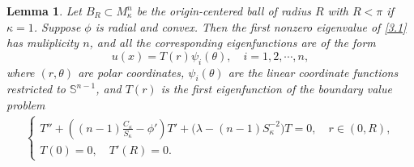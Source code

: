 \documentclass[11pt,leqno]{amsart}
\newtheorem{lemma}{Lemma}[section]
\def\k{\kappa}
\def\k{\kappa}
\numberwithin{equation}{section}
\begin{document}
\begin{lemma}\label{lm3.1}
Let $B_R\subset M_\k^n$ be the origin-centered ball of radius $R$ with $R<\pi$ if $\k=1$. Suppose $\phi$ is  radial and convex. Then the first nonzero eigenvalue  of \eqref{3.1} has muliplicity $n$, and all the corresponding eigenfunctions are of the form
$$
u(x)=T(r)\psi_i(\theta), \quad i=1,2, \cdots, n,
$$
where $(r, \theta)$ are polar coordinates, $\psi_i(\theta)$ are the linear coordinate functions restricted to $\mathbb{S}^{n-1}$, and 
$T(r)$ is the first eigenfunction of the boundary value problem
\begin{align}\label{3.2}
    \begin{cases}
T'' + \left((n-1)\frac{C_\kappa}{S_\kappa} - \phi'\right)T' + \big(\lambda - (n-1)S_\kappa^{-2}\big)T = 0,\quad r\in (0, R),\\
T(0) = 0,\quad T'(R) = 0. 
\end{cases}
\end{align}
\end{lemma}
\end{document}
